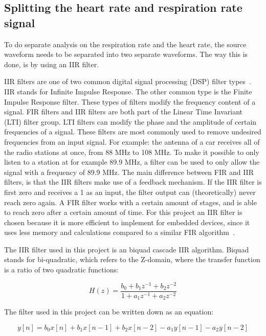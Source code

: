 \subsection{Splitting the heart rate and respiration rate signal}
To do separate analysis on the respiration rate and the heart rate, the source waveform needs to be separated into two separate waveforms. The way this is done, is by using an IIR filter.

IIR filters are one of two common digital signal processing (DSP) filter types~\cite{iir_info_website}. IIR stands for Infinite Impulse Response. The other common type is the Finite Impulse Response filter. These types of filters modify the frequency content of a signal. FIR filters and IIR filters are both part of the Linear Time Invariant (LTI) filter group. LTI filters can modify the phase and the amplitude of certain frequencies of a signal. These filters are most commonly used to remove undesired frequencies from an input signal. For example: the antenna of a car receives all of the radio stations at once, from 88 MHz to 108 MHz. To make it possible to only listen to a station at for example 89.9 MHz, a filter can be used to only allow the signal with a frequency of 89.9 MHz. The main difference between FIR and IIR filters, is that the IIR filters make use of a feedback mechanism. If the IIR filter is first zero and receives a 1 as an input, the filter output can (theoretically) never reach zero again. A FIR filter works with a certain amount of stages, and is able to reach zero after a certain amount of time. For this project an IIR filter is chosen because it is more efficient to implement for embedded devices, since it uses less memory and calculations compared to a similar FIR algorithm~\cite{iir_faq_website}. 

The IIR filter used in this project is an biquad cascade IIR algorithm. Biquad stands for bi-quadratic, which refers to the Z-domain, where the transfer function is a ratio of two quadratic functions:

\begin{equation}
\label{eq:biquad_filter_z}
    H(z)={\frac {b_{0}+b_{1}z^{-1}+b_{2}z^{-2}}{1+a_{1}z^{-1}+a_{2}z^{-2}}}
\end{equation}

The filter used in this project can be written down as an equation:

\begin{equation}
\label{eq:biquad_filter}
    y[n]=b_{0}x[n]+b_{1}x[n-1]+b_{2}x[n-2]-a_{1}y[n-1]-a_{2}y[n-2]
\end{equation}

